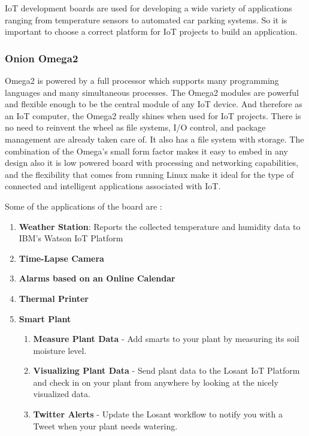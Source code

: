 \documentclass[a4paper,11pt]{article}
\begin{document}
\begin{iotsolution}
IoT development boards are used for developing a wide variety of applications ranging from temperature sensors to automated car parking systems. So it is important to choose a correct platform for IoT projects to build an application.

\subsubsection*{Onion Omega2}
Omega2 is powered by a full processor which supports many programming languages and many simultaneous processes. The Omega2 modules are powerful and flexible enough to be the central module of any IoT device. And therefore as an IoT computer, the Omega2 really shines when used for IoT projects. There is no need to reinvent the wheel as file systems, I/O control, and package management are already taken care of.\cite{[A1]} It also has a file system with storage. The combination of the Omega’s small form factor makes it easy to embed in any design also it is low powered board with processing and networking capabilities, and the flexibility that comes from running Linux make it ideal for the type of connected and intelligent applications associated with IoT.

Some of the applications of the board are \cite{[A1]}:
\begin{enumerate}
    \item \textbf{Weather Station}:  Reports the collected temperature and humidity data to IBM’s Watson IoT Platform

    \item \textbf{Time-Lapse Camera}

    \item \textbf{Alarms based on an Online Calendar }

\item \textbf{Thermal Printer}

\item \textbf{Smart Plant}
    \begin{enumerate}
    \item \textbf{Measure Plant Data} - Add smarts to your plant by measuring its soil moisture level.
    
    \item \textbf{Visualizing Plant Data} - Send plant data to the Losant IoT Platform and check in on your plant from anywhere by looking at the nicely visualized data.
    
    \item \textbf{Twitter Alerts} - Update the Losant workflow to notify you with a Tweet when your plant needs watering.
    

\end{enumerate}
\end{enumerate}
\end{iotsolution}
\end{document}
